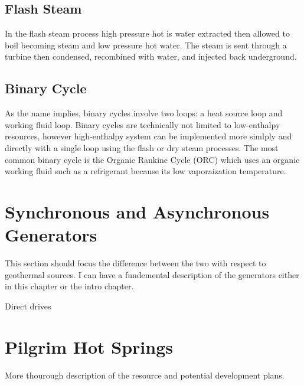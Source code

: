 \subsection{Flash Steam} 
In the flash steam process high pressure hot is water extracted then allowed to boil becoming steam and low pressure hot water. The steam is sent through a turbine then condensed, recombined with water, and injected back underground.

\subsection{Binary Cycle} 
As the name implies, binary cycles involve two loops: a heat source loop and working fluid loop. Binary cycles are technically not limited to low-enthalpy resources, however high-enthalpy system can be implemented more simlply and directly with a single loop using the flash or dry steam processes. The most common binary cycle is the Organic Rankine Cycle (ORC) which uses an organic working fluid such as a refrigerant because its low vaporaization temperature.


\section{Synchronous and Asynchronous Generators}
This section should focus the difference between the two with respect to geothermal sources. I can have a fundemental description of the generators either in this chapter or the intro chapter.

Direct drives

\section{Pilgrim Hot Springs}
More thourough description of the resource and potential development plans.


